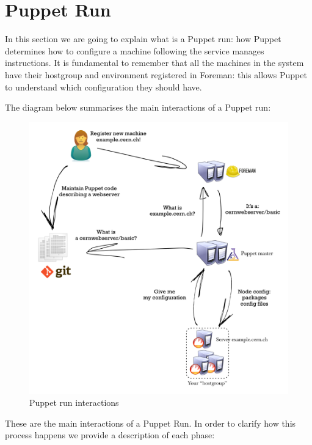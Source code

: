 \section{Puppet Run}

In this section we are going to explain what is a Puppet run: how Puppet
determines how to configure a machine following the service manages
instructions. It is fundamental to remember that all the machines in the
system have their hostgroup and environment registered in Foreman: this
allows Puppet to understand which configuration they should have.

The diagram below summarises the main interactions of a Puppet run:

\begin{figure}[H]
\includegraphics[width=\textwidth,height=\textheight,keepaspectratio]{ConfigurationManagement/PuppetRun/PuppetRun.png}
\caption{Puppet run interactions}
\end{figure}

These are the main interactions of a Puppet Run. In order to clarify how
this process happens we provide a description of each phase:

